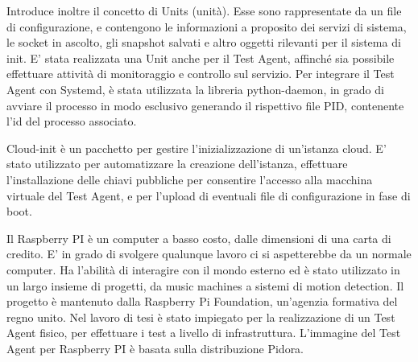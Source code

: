 \begin{description}[nolistsep]
Introduce inoltre il concetto di Units (unità). Esse sono rappresentate da un file di configurazione, e contengono le informazioni a proposito dei servizi di sistema, le socket in ascolto, gli snapshot salvati e altro oggetti rilevanti per il sistema di init.
\newline
E' stata realizzata una Unit anche per il Test Agent, affinché sia possibile effettuare attività di monitoraggio e controllo sul servizio. Per integrare il Test Agent con Systemd, è stata utilizzata la libreria python-daemon, in grado di avviare il processo in modo esclusivo generando il rispettivo file PID, contenente l'id del processo associato.
\item[Cloud-init]
Cloud-init è un pacchetto per gestire l'inizializzazione di un'istanza cloud.
\newline
E' stato utilizzato per automatizzare la creazione dell'istanza, effettuare l'installazione delle chiavi pubbliche per consentire l'accesso alla macchina virtuale del Test Agent, e per l'upload di eventuali file di configurazione in fase di boot.
\item[Raspberry PI]
Il Raspberry PI è un computer a basso costo, dalle dimensioni di una carta di credito. E' in grado di svolgere qualunque lavoro ci si aspetterebbe da un normale computer. Ha l'abilità di interagire con il mondo esterno ed è stato utilizzato in un largo insieme di progetti, da music machines a sistemi di motion detection.
Il progetto è mantenuto dalla Raspberry Pi Foundation, un'agenzia formativa del regno unito.
\newline
Nel lavoro di tesi è stato impiegato per la realizzazione di un Test Agent fisico, per effettuare i test a livello di infrastruttura.
L'immagine del Test Agent per Raspberry PI è basata sulla distribuzione Pidora.
\end{description}

